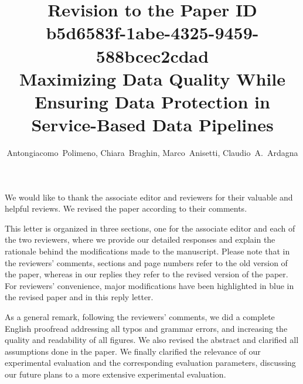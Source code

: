 \documentclass{article}
\begin{document}


\newcommand{\customTheoremBlock}[2]{\begin{adjustwidth}{25pt}{25pt}\textbf{\emph{#1}} #2\end{adjustwidth}}
\newcommand{\customFigCaption}[2]{{\footnotesize Fig. #1.~#2}}
\newcommand{\customSecName}[2]{{\large \textbf{#1~#2}}}
\newcommand{\customTableCaption}[2]{{\centering TABLE~#1 #2}}

\title{\large \textbf{Revision to the Paper ID b5d6583f-1abe-4325-9459-588bcec2cdad\\Maximizing Data Quality While Ensuring Data
Protection in Service-Based Data Pipelines\\}}

\author{Antongiacomo~Polimeno, Chiara~Braghin, Marco~Anisetti, Claudio~A.~Ardagna}

\date{}

\maketitle

We would like to thank the associate editor and reviewers for their valuable and helpful reviews. We revised the paper according to their comments.

\vspace{1em}

This letter is organized in three sections, one for the associate editor and each of the two  reviewers, where we provide our detailed responses and explain the rationale behind the modifications made to the manuscript.
Please note that in the reviewers' comments, sections and page numbers refer to the old version
of the paper, whereas in our replies they refer to the revised version of the paper. For reviewers' convenience, major modifications have been highlighted in {\color{OurColor}blue} in the revised paper and in this reply letter.

\vspace{1em}

As a general remark, following the reviewers' comments, we did a complete English proofread addressing all typos and grammar errors, and increasing the quality and readability of all figures. We also revised the abstract and clarified all assumptions done in the paper. We finally clarified the relevance of our experimental evaluation and the corresponding evaluation parameters, discussing our future plans to a more extensive experimental evaluation.
\end{document}
